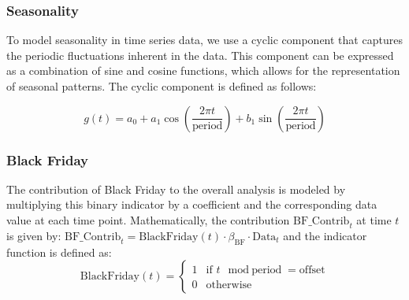 \documentclass{article}
\begin{document}
\subsubsection{Seasonality}

\noindent
To model seasonality in time series data, we use a cyclic component that captures the periodic fluctuations inherent in the data. This component can be expressed as a combination of sine and cosine functions, which allows for the representation of seasonal patterns. The cyclic component is defined as follows:

\[
g(t) = a_0 + a_1 \cos\left(\frac{2 \pi t}{\text{period}}\right) + b_1 \sin\left(\frac{2 \pi t}{\text{period}}\right)
\]


\subsubsection{Black Friday}
\noindent
The contribution of Black Friday to the overall analysis is modeled by multiplying this binary indicator by a coefficient and the corresponding data value at each time point. Mathematically, the contribution \( \mathrm{BF\_Contrib}_t \) at time \( t \) is given by:
$\mathrm{BF\_Contrib}_t = \mathrm{BlackFriday}(t) \cdot \beta_{\mathrm{BF}} \cdot \text{Data}_t$ and the indicator function is defined as:
\[
\mathrm{BlackFriday}(t) = 
\begin{cases} 
1 & \text{if } t \mod \text{period} = \text{offset} \\ 
0 & \text{otherwise} 
\end{cases}
\]
\end{document}
